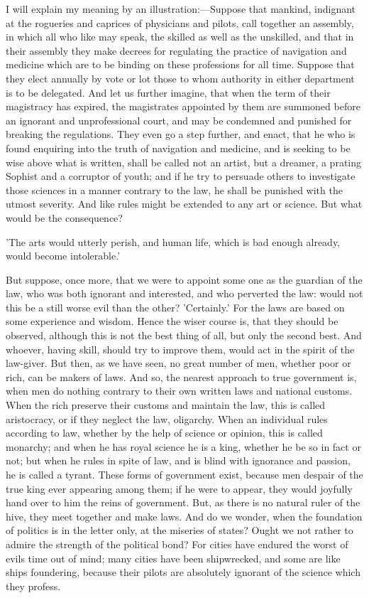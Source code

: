 \documentclass[11pt,letter]{article}
\begin{document}
\par  I will explain my meaning by an illustration:—Suppose that mankind, indignant at the rogueries and caprices of physicians and pilots, call together an assembly, in which all who like may speak, the skilled as well as the unskilled, and that in their assembly they make decrees for regulating the practice of navigation and medicine which are to be binding on these professions for all time. Suppose that they elect annually by vote or lot those to whom authority in either department is to be delegated. And let us further imagine, that when the term of their magistracy has expired, the magistrates appointed by them are summoned before an ignorant and unprofessional court, and may be condemned and punished for breaking the regulations. They even go a step further, and enact, that he who is found enquiring into the truth of navigation and medicine, and is seeking to be wise above what is written, shall be called not an artist, but a dreamer, a prating Sophist and a corruptor of youth; and if he try to persuade others to investigate those sciences in a manner contrary to the law, he shall be punished with the utmost severity. And like rules might be extended to any art or science. But what would be the consequence?

\par  'The arts would utterly perish, and human life, which is bad enough already, would become intolerable.'

\par  But suppose, once more, that we were to appoint some one as the guardian of the law, who was both ignorant and interested, and who perverted the law: would not this be a still worse evil than the other? 'Certainly.' For the laws are based on some experience and wisdom. Hence the wiser course is, that they should be observed, although this is not the best thing of all, but only the second best. And whoever, having skill, should try to improve them, would act in the spirit of the law-giver. But then, as we have seen, no great number of men, whether poor or rich, can be makers of laws. And so, the nearest approach to true government is, when men do nothing contrary to their own written laws and national customs. When the rich preserve their customs and maintain the law, this is called aristocracy, or if they neglect the law, oligarchy. When an individual rules according to law, whether by the help of science or opinion, this is called monarchy; and when he has royal science he is a king, whether he be so in fact or not; but when he rules in spite of law, and is blind with ignorance and passion, he is called a tyrant. These forms of government exist, because men despair of the true king ever appearing among them; if he were to appear, they would joyfully hand over to him the reins of government. But, as there is no natural ruler of the hive, they meet together and make laws. And do we wonder, when the foundation of politics is in the letter only, at the miseries of states? Ought we not rather to admire the strength of the political bond? For cities have endured the worst of evils time out of mind; many cities have been shipwrecked, and some are like ships foundering, because their pilots are absolutely ignorant of the science which they profess.
\end{document}
